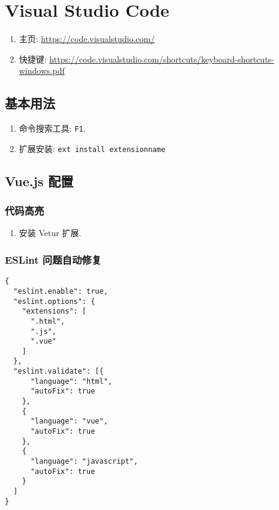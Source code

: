 \section{Visual Studio Code}\label{visual-studio-code}

\begin{enumerate}
\def\labelenumi{\arabic{enumi}.}
\tightlist
\item
  主页: \url{https://code.visualstudio.com/}
\item
  快捷键:
  \url{https://code.visualstudio.com/shortcuts/keyboard-shortcuts-windows.pdf}
\end{enumerate}

\subsection{基本用法}\label{ux57faux672cux7528ux6cd5}

\begin{enumerate}
\def\labelenumi{\arabic{enumi}.}
\tightlist
\item
  命令搜索工具: \lstinline!F1!.
\item
  扩展安装: \lstinline!ext install extensionname!
\end{enumerate}

\subsection{Vue.js 配置}\label{vue.js-ux914dux7f6e}

\subsubsection{代码高亮}\label{ux4ee3ux7801ux9ad8ux4eae}

\begin{enumerate}
\def\labelenumi{\arabic{enumi}.}
\tightlist
\item
  安装 Vetur 扩展.
\end{enumerate}

\subsubsection{ESLint
问题自动修复}\label{eslint-ux95eeux9898ux81eaux52a8ux4feeux590d}

\begin{lstlisting}
{
  "eslint.enable": true,
  "eslint.options": {
    "extensions": [
      ".html",
      ".js",
      ".vue"
    ]
  },
  "eslint.validate": [{
      "language": "html",
      "autoFix": true
    },
    {
      "language": "vue",
      "autoFix": true
    },
    {
      "language": "javascript",
      "autoFix": true
    }
  ]
}
\end{lstlisting}

